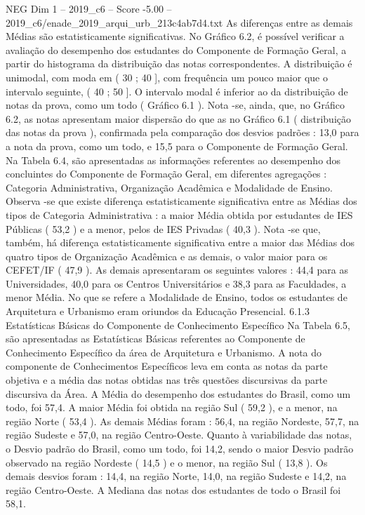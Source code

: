 \begin{textsample}{NEG Dim 1 – 2019\_c6 – Score -5.00 – 2019\_c6/enade\_2019\_arqui\_urb\_213c4ab7d4.txt}
As diferenças entre as demais Médias são estatisticamente significativas.
No Gráfico 6.2, é possível verificar a avaliação do desempenho dos estudantes do Componente de Formação Geral, a partir do histograma da distribuição das notas correspondentes.
A distribuição é unimodal, com moda em ( 30 ; 40 ], com frequência um pouco maior que o intervalo seguinte, ( 40 ; 50 ].
O intervalo modal é inferior ao da distribuição de notas da prova, como um todo ( Gráfico 6.1 ).
Nota -se, ainda, que, no Gráfico 6.2, as notas apresentam maior dispersão do que as no Gráfico 6.1 ( distribuição das notas da prova ), confirmada pela comparação dos desvios padrões : 13,0 para a nota da prova, como um todo, e 15,5 para o Componente de Formação Geral.
Na Tabela 6.4, são apresentadas as informações referentes ao desempenho dos concluintes do Componente de Formação Geral, em diferentes agregações : Categoria Administrativa, Organização Acadêmica e Modalidade de Ensino.
Observa -se que existe diferença estatisticamente significativa entre as Médias dos tipos de Categoria Administrativa : a maior Média obtida por estudantes de IES Públicas ( 53,2 ) e a menor, pelos de IES Privadas ( 40,3 ).
Nota -se que, também, há diferença estatisticamente significativa entre a maior das Médias dos quatro tipos de Organização Acadêmica e as demais, o valor maior para os CEFET/IF ( 47,9 ).
As demais apresentaram os seguintes valores : 44,4 para as Universidades, 40,0 para os Centros Universitários e 38,3 para as Faculdades, a menor Média.
No que se refere a Modalidade de Ensino, todos os estudantes de Arquitetura e Urbanismo eram oriundos da Educação Presencial. 6.1.3 Estatísticas Básicas do Componente de Conhecimento Específico Na Tabela 6.5, são apresentadas as Estatísticas Básicas referentes ao Componente de Conhecimento Específico da área de Arquitetura e Urbanismo.
A nota do componente de Conhecimentos Específicos leva em conta as notas da parte objetiva e a média das notas obtidas nas três questões discursivas da parte discursiva da Área.
A Média do desempenho dos estudantes do Brasil, como um todo, foi 57,4.
A maior Média foi obtida na região Sul ( 59,2 ), e a menor, na região Norte ( 53,4 ).
As demais Médias foram : 56,4, na região Nordeste, 57,7, na região Sudeste e 57,0, na região Centro-Oeste.
Quanto à variabilidade das notas, o Desvio padrão do Brasil, como um todo, foi 14,2, sendo o maior Desvio padrão observado na região Nordeste ( 14,5 ) e o menor, na região Sul ( 13,8 ).
Os demais desvios foram : 14,4, na região Norte, 14,0, na região Sudeste e 14,2, na região Centro-Oeste.
A Mediana das notas dos estudantes de todo o Brasil foi 58,1.

\end{textsample}

